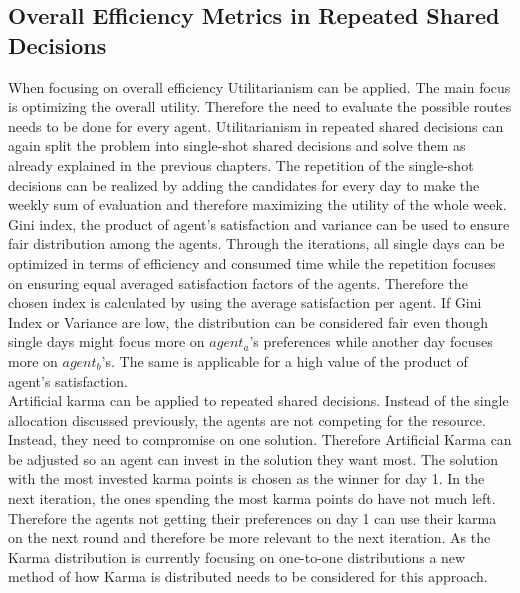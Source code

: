 \documentclass[german, a4paper, 11pt, oneside]{scrbook}
\begin{document}
\subsection{Overall Efficiency Metrics in Repeated Shared Decisions}
When focusing on overall efficiency Utilitarianism can be applied. The main focus is optimizing the overall utility. Therefore the need to evaluate the possible routes needs to be done for every agent. Utilitarianism in repeated shared decisions can again split the problem into single-shot shared decisions and solve them as already explained in the previous chapters. The repetition of the single-shot decisions can be realized by adding the candidates for every day to make the weekly sum of evaluation and therefore maximizing the utility of the whole week. \\Gini index, the product of agent's satisfaction and variance can be used to ensure fair distribution among the agents. Through the iterations, all single days can be optimized in terms of efficiency and consumed time while the repetition focuses on ensuring equal averaged satisfaction factors of the agents. Therefore the chosen index is calculated by using the average satisfaction per agent. If Gini Index or Variance are low, the distribution can be considered fair even though single days might focus more on $agent_a$'s preferences while another day focuses more on $agent_ b$'s. The same is applicable for a high value of the product of agent's satisfaction.
\\Artificial karma can be applied to repeated shared decisions. Instead of the single allocation discussed previously, the agents are not competing for the resource. Instead, they need to compromise on one solution. Therefore Artificial Karma can be adjusted so an agent can invest in the solution they want most. The solution with the most invested karma points is chosen as the winner for day 1. In the next iteration, the ones spending the most karma points do have not much left. Therefore the agents not getting their preferences on day 1 can use their karma on the next round and therefore be more relevant to the next iteration. As the Karma distribution is currently focusing on one-to-one distributions a new method of how Karma is distributed needs to be considered for this approach.
\end{document}
